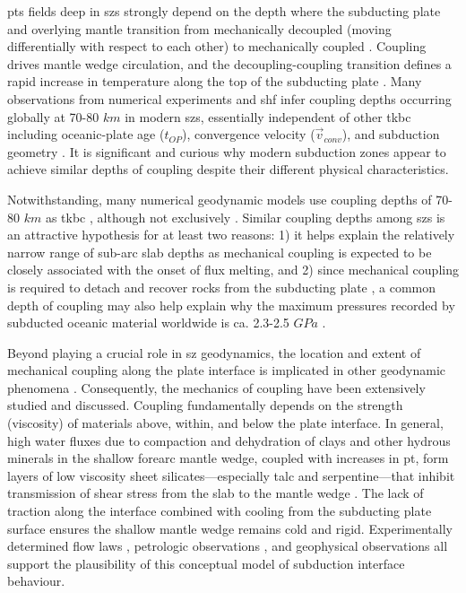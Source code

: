 \Gls{pts} fields deep in \glspl{sz} strongly depend on the depth where the subducting plate and overlying mantle transition from mechanically decoupled (moving differentially with respect to each other) to mechanically coupled \citep[moving with the same local velocity,][]{Furukawa1993, Peacock1994, Wada2008}. Coupling drives mantle wedge circulation, and the decoupling-coupling transition defines a rapid increase in temperature along the top of the subducting plate \citep{Peacock1996}. Many observations from numerical experiments and \gls{shf} infer coupling depths occurring globally at 70-80 \(km\) in modern \glspl{sz}, essentially independent of other \gls{tkbc} including oceanic-plate age (\(t_{OP}\)), convergence velocity (\(\vec{v}_{conv}\)), and subduction geometry \citep{Furukawa1993, Wada2008, Wada2009}. It is significant and curious why modern subduction zones appear to achieve similar depths of coupling despite their different physical characteristics.

Notwithstanding, many numerical geodynamic models use coupling depths of 70-80 \(km\) as \gls{tkbc} \citep[e.g.,][]{Abers2017, Currie2004, Syracuse2010, VanKeken2011, VanKeken2018, Wada2012, Gao2014, Wilson2014}, although not exclusively \citep[e.g.~40-56 \(km\),][]{England2010, Peacock1996}. Similar coupling depths among \glspl{sz} is an attractive hypothesis for at least two reasons: 1) it helps explain the relatively narrow range of sub-arc slab depths \citep{England2004, Syracuse2006} as mechanical coupling is expected to be closely associated with the onset of flux melting, and 2) since mechanical coupling is required to detach and recover rocks from the subducting plate \citep{Agard2016}, a common depth of coupling may also help explain why the maximum pressures recorded by subducted oceanic material worldwide is ca. 2.3-2.5 \(GPa\) \citep[roughly 80 \(km\),][]{Agard2009}.

Beyond playing a crucial role in \gls{sz} geodynamics, the location and extent of mechanical coupling along the plate interface is implicated in other geodynamic phenomena \citep[seismicity, metamorphism, volatile fluxes into the mantle wedge, volcanism, and plate motions, e.g.,][]{Cizkova2013, Gonzalez2016, Peacock1990, Peacock1991, Peacock1993, Peacock1996, Peacock1999a, Hacker2003, VanKeken2011, Grove2012, Gao2017}. Consequently, the mechanics of coupling have been extensively studied and discussed. Coupling fundamentally depends on the strength (viscosity) of materials above, within, and below the plate interface. In general, high water fluxes due to compaction and dehydration of clays and other hydrous minerals in the shallow forearc mantle wedge, coupled with increases in \gls{pt}, form layers of low viscosity sheet silicates---especially talc and serpentine---that inhibit transmission of shear stress from the slab to the mantle wedge \citep{Peacock1999a}. The lack of traction along the interface combined with cooling from the subducting plate surface ensures the shallow mantle wedge remains cold and rigid. Experimentally determined flow laws \citep[e.g.,][]{Agard2016}, petrologic observations \citep[e.g.,][]{Agard2016}, and geophysical observations \citep[e.g.,][]{Gao2014, Peacock1999a} all support the plausibility of this conceptual model of subduction interface behaviour.

